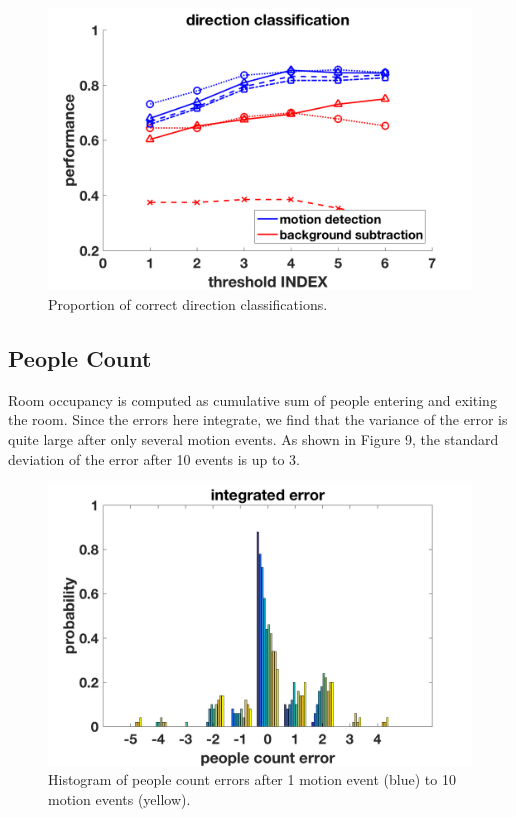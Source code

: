 \documentclass[12pt,oneside]{article} %
\begin{document}
\begin{figure}[htb]
\centering
\includegraphics[scale=0.52]{images/dirClass.png}
\caption{Proportion of correct direction classifications.}
\label{dirclass}
\end{figure}

\subsection{People Count}
Room occupancy is computed as cumulative sum of people entering and exiting the room. Since the errors here
integrate, we find that the variance of the error is quite large after only several motion events. As shown in Figure 9,
the standard deviation of the error after 10 events is up to 3.
\begin{figure}[htb]
\centering
\includegraphics[scale=0.52]{images/pcerror_gamma020_hist.png}
\caption{Histogram of people count errors after 1 motion event (blue) to 10 motion events (yellow).}
\label{hist}
\end{figure}
\end{document}
